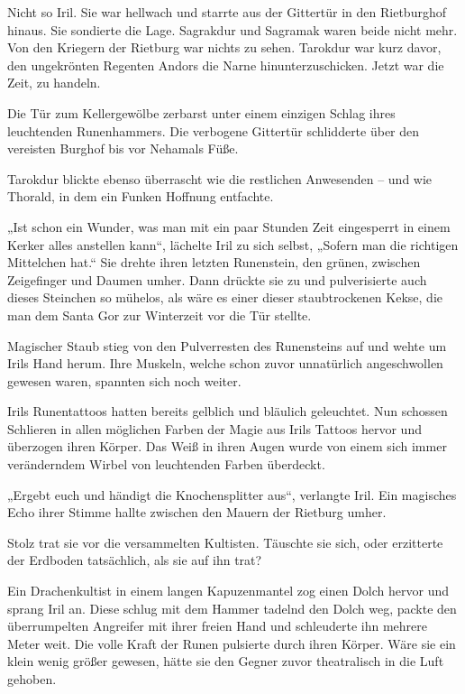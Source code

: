 Nicht so Iril. Sie war hellwach und starrte aus der Gittertür in den Rietburghof hinaus. Sie sondierte die Lage. Sagrakdur und Sagramak waren beide nicht mehr. Von den Kriegern der Rietburg war nichts zu sehen. Tarokdur war kurz davor, den ungekrönten Regenten Andors die Narne hinunterzuschicken. Jetzt war die Zeit, zu handeln.

Die Tür zum Kellergewölbe zerbarst unter einem einzigen Schlag ihres leuchtenden Runenhammers. Die verbogene Gittertür schlidderte über den vereisten Burghof bis vor Nehamals Füße.

Tarokdur blickte ebenso überrascht wie die restlichen Anwesenden – und wie Thorald, in dem ein Funken Hoffnung entfachte.

„Ist schon ein Wunder, was man mit ein paar Stunden Zeit eingesperrt in einem Kerker alles anstellen kann“, lächelte Iril zu sich selbst, „Sofern man die richtigen Mittelchen hat.“ Sie drehte ihren letzten Runenstein, den grünen, zwischen Zeigefinger und Daumen umher. Dann drückte sie zu und pulverisierte auch dieses Steinchen so mühelos, als wäre es einer dieser staubtrockenen Kekse, die man dem Santa Gor zur Winterzeit vor die Tür stellte.

Magischer Staub stieg von den Pulverresten des Runensteins auf und wehte um Irils Hand herum. Ihre Muskeln, welche schon zuvor unnatürlich angeschwollen gewesen waren, spannten sich noch weiter.

Irils Runentattoos hatten bereits gelblich und bläulich geleuchtet. Nun schossen Schlieren in allen möglichen Farben der Magie aus Irils Tattoos hervor und überzogen ihren Körper. Das Weiß in ihren Augen wurde von einem sich immer veränderndem Wirbel von leuchtenden Farben überdeckt.

„Ergebt euch und händigt die Knochensplitter aus“, verlangte Iril. Ein magisches Echo ihrer Stimme hallte zwischen den Mauern der Rietburg umher.

Stolz trat sie vor die versammelten Kultisten. Täuschte sie sich, oder erzitterte der Erdboden tatsächlich, als sie auf ihn trat?

Ein Drachenkultist in einem langen Kapuzenmantel zog einen Dolch hervor und sprang Iril an. Diese schlug mit dem Hammer tadelnd den Dolch weg, packte den überrumpelten Angreifer mit ihrer freien Hand und schleuderte ihn mehrere Meter weit. Die volle Kraft der Runen pulsierte durch ihren Körper. Wäre sie ein klein wenig größer gewesen, hätte sie den Gegner zuvor theatralisch in die Luft gehoben.

